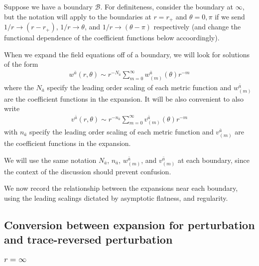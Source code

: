 \documentclass[aps,prd,amsmath,showpacs,amssymb,superscriptaddress,nofootinbib,longbibliography,eqsecnum,preprintnumbers]{revtex4-1}
\begin{document}
Suppose we have a boundary $\mathcal{B}$. For definiteness, consider the boundary at $\infty$, but the notation will apply to the boundaries at $r=r_+$ and $\theta =0,\pi$ if we send $1/r \to (r-r_+)$,  $1/r \to \theta$, and $ 1/r \to (\theta -\pi)$ respectively (and change the functional dependence of the coefficient functions below accoordingly).

When we expand the field equations off of a boundary, we will look for solutions of the form
\begin{align}
w^{\bar a}(r,\theta) \sim r^{-N_{\bar a}}\sum_{m=0}^\infty w^{\bar a}_{(m)}(\theta)r^{-m} \label{eq:wexp3}
\end{align}
where the $N_{\bar a}$ specify the leading order scaling of each metric function and $w^{\bar a}_{(m)}$ are the coefficient functions in the expansion.
It will be also convenient to also write
\begin{align}
v^{\bar a}(r,\theta) \sim r^{-n_{\bar a}}\sum_{m=0}^\infty v^{\bar a}_{(m)}(\theta)r^{-m} \label{eq:vexp3}
\end{align}
with  $n_{\bar a}$ specify the leading order scaling of each metric function and $v^{\bar a}_{(m)}$ are the coefficient functions in the expansion. 

We will use the same notation $N_{\bar a}$, $n_{\bar a}$,  $w^{\bar a}_{(m)}$,  and $v^{\bar a}_{(m)}$ at each boundary, since the context of the discussion should prevent confusion.

We now record the relationship between the expansions near each boundary, using the leading scalings dictated by asymptotic flatness, and regularity.

\subsection{Conversion between expansion for perturbation and trace-reversed perturbation}
\label{sec:trrel}

\subsubsection{$r=\infty$}
\end{document}
